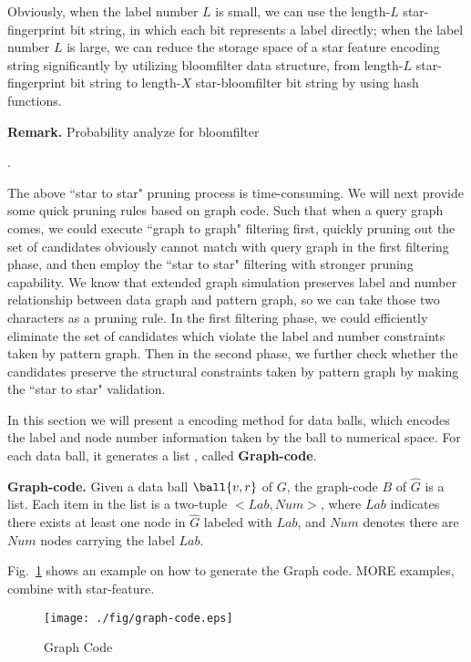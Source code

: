 Obviously, when the label number $L$ is small, we can use the length-$L$ star-fingerprint bit string, in which each bit represents a label directly; when the label number $L$ is large, we can reduce the storage space of a star feature encoding string significantly by utilizing bloomfilter data structure, from length-$L$ star-fingerprint bit string to length-$X$ star-bloomfilter bit string by using hash functions.

\textcolor[rgb]{1.00,0.00,0.00}{\textbf{Remark.}
Probability analyze for bloomfilter}

.

The above ``star to star" pruning process is time-consuming. We will next provide some quick pruning rules based on graph code. Such that when a query graph comes, we could execute ``graph to graph" filtering first, quickly pruning out the set of candidates obviously cannot match with query graph in the first filtering phase, and then employ the ``star to star" filtering with stronger pruning capability. We know that extended graph simulation preserves label and number relationship between data graph and pattern graph, so we can take those two characters as a pruning rule. In the first filtering phase, we could efficiently eliminate the set of candidates which violate the label and number constraints taken by pattern graph. Then in the second phase, we further check whether the candidates preserve the structural constraints taken by pattern graph by making the ``star to star" validation.

In this section we will present a encoding method for data balls, which encodes the label and node number information taken by the ball to numerical space. For each data ball, it generates a list , called \textbf{Graph-code}.

\begin{definition} {\textbf{Graph-code.}}
\label{def-ind-graph-code-arr}
Given a data ball $\ball{v, r}$ of $G$, the graph-code $B$ of $\hat{G}$ is a list. Each item in the list is a two-tuple $<Lab, Num>$, where $Lab$ indicates there exists at least one node in $\hat{G}$ labeled with $Lab$, and $Num$ denotes there are $Num$ nodes carrying the label $Lab$.
\end{definition}

Fig.~\ref{fig-graphcode-example} shows an example on how to generate the Graph code. \textcolor[rgb]{0.00,0.00,1.00}{MORE examples, combine with star-feature.}

\begin{figure}[tb!]
\begin{center}
\texttt{[image: ./fig/graph-code.eps]}
\caption{Graph Code}
\label{fig-graphcode-example}
\end{center}
\end{figure}

